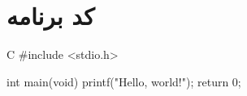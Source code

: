 \section{کد برنامه}


\begin{codebox}[title=hello.c]{C}
#include <stdio.h>

int main(void) {
    printf("Hello, world!\n");
    return 0;
}
\end{codebox}
